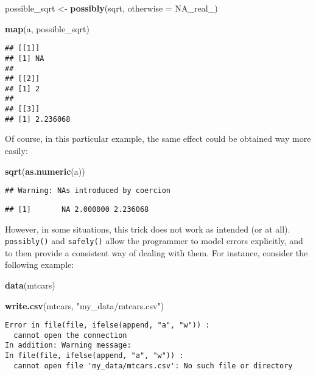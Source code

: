 \documentclass[
]{article}
\newenvironment{Shaded}{\begin{snugshade}}{\end{snugshade}}
\newcommand{\DataTypeTok}[1]{\textcolor[rgb]{0.13,0.29,0.53}{#1}}
\newcommand{\KeywordTok}[1]{\textcolor[rgb]{0.13,0.29,0.53}{\textbf{#1}}}
\newcommand{\NormalTok}[1]{#1}
\newcommand{\OtherTok}[1]{\textcolor[rgb]{0.56,0.35,0.01}{#1}}
\newcommand{\StringTok}[1]{\textcolor[rgb]{0.31,0.60,0.02}{#1}}
\begin{document}
\begin{Shaded}
\begin{Highlighting}[]
\NormalTok{possible\_sqrt \textless{}{-}}\StringTok{ }\KeywordTok{possibly}\NormalTok{(sqrt, }\DataTypeTok{otherwise =} \OtherTok{NA\_real\_}\NormalTok{)}

\KeywordTok{map}\NormalTok{(a, possible\_sqrt)}
\end{Highlighting}
\end{Shaded}

\begin{verbatim}
## [[1]]
## [1] NA
## 
## [[2]]
## [1] 2
## 
## [[3]]
## [1] 2.236068
\end{verbatim}

Of course, in this particular example, the same effect could be obtained way more easily:

\begin{Shaded}
\begin{Highlighting}[]
\KeywordTok{sqrt}\NormalTok{(}\KeywordTok{as.numeric}\NormalTok{(a))}
\end{Highlighting}
\end{Shaded}

\begin{verbatim}
## Warning: NAs introduced by coercion
\end{verbatim}

\begin{verbatim}
## [1]       NA 2.000000 2.236068
\end{verbatim}

However, in some situations, this trick does not work as intended (or at all). \texttt{possibly()} and
\texttt{safely()} allow the programmer to model errors explicitly, and to then provide a consistent way
of dealing with them. For instance, consider the following example:

\begin{Shaded}
\begin{Highlighting}[]
\KeywordTok{data}\NormalTok{(mtcars)}

\KeywordTok{write.csv}\NormalTok{(mtcars, }\StringTok{"my\_data/mtcars.csv"}\NormalTok{)}
\end{Highlighting}
\end{Shaded}

\begin{verbatim}
Error in file(file, ifelse(append, "a", "w")) : 
  cannot open the connection
In addition: Warning message:
In file(file, ifelse(append, "a", "w")) :
  cannot open file 'my_data/mtcars.csv': No such file or directory
\end{verbatim}
\end{document}
